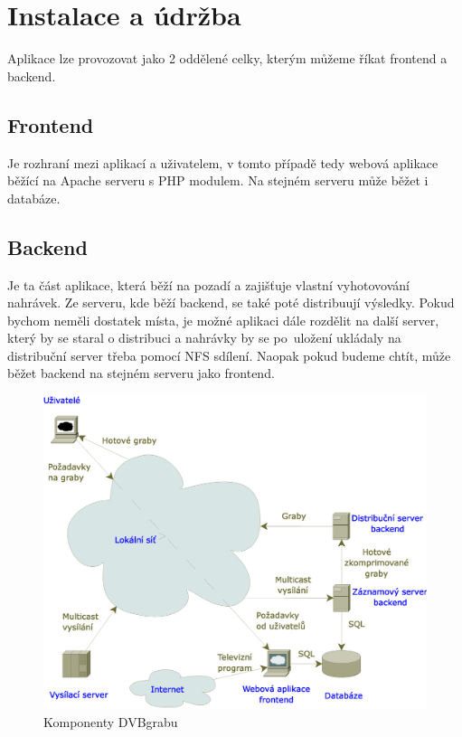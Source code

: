\chapter{Instalace a údržba}
Aplikace lze provozovat jako 2 oddělené celky, kterým můžeme říkat frontend a backend.
\section{Frontend}
Je rozhraní mezi aplikací a uživatelem, v tomto případě tedy webová aplikace běžící na Apache serveru s PHP modulem. Na stejném serveru může běžet i databáze.
\section{Backend}
Je ta část aplikace, která běží na pozadí a zajišťuje vlastní vyhotovování nahrávek. Ze serveru, kde běží backend, se také poté distribuují výsledky. Pokud bychom neměli dostatek místa, je možné aplikaci dále rozdělit na další server, který by se staral o distribuci a nahrávky by se po~uložení ukládaly na distribuční server třeba pomocí NFS sdílení. Naopak pokud budeme chtít, může běžet backend na stejném serveru jako frontend.

\begin{figure}[ht]
\begin{center}
\includegraphics[width=15cm]{images/dvbgrab.eps}
\caption{Komponenty DVBgrabu}
\label{fig:dvbgrab}
\end{center}
\end{figure}

